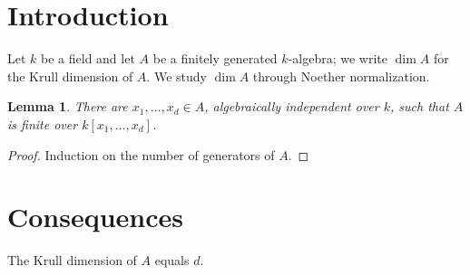 \documentclass{article}
\newtheorem{lemma}{Lemma}
\begin{document}
\section{Introduction}
Let $k$ be a field and let $A$ be a finitely generated $k$-algebra; we write $\dim A$ for the Krull dimension of $A$.
We study $\dim A$ through Noether normalization.

\begin{lemma}\label{lem:finite}
  There are $x_1, \dots, x_d \in A$, algebraically independent
  over $k$, such that $A$ is finite over $k[x_1, \dots, x_d]$.
\end{lemma}

\begin{proof}
  Induction on the number of generators of $A$.
\end{proof}

\section{Consequences}
The Krull dimension of $A$ equals $d$.
\end{document}
